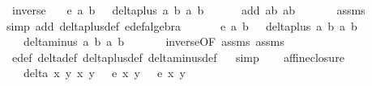 \begin{isabellebody}
\ inverse{\isacharcolon}\isanewline
\ \ \ {\isachardoublequoteopen}e\ a\ b\ {\isacharequal}\ {}{\isachardoublequoteclose}\ {\isachardoublequoteopen}delta{\isacharunderscore}plus\ a\ b\ a\ b\ {\isasymnoteq}\ {}{\isachardoublequoteclose}\ \isanewline
\ \ \ {\isachardoublequoteopen}add\ {\isacharparenleft}a{\isacharcomma}b{\isacharparenright}\ {\isacharparenleft}a{\isacharcomma}{\isacharminus}b{\isacharparenright}\ {\isacharequal}\ {\isacharparenleft}{}{\isacharcomma}{}{\isacharparenright}{\isachardoublequoteclose}\ \isanewline
%
\isadelimproof
\ \ %
\endisadelimproof
%
\isatagproof
{}\isamarkupfalse%
\ assms\ \isamarkupfalse%
{\isacharparenleft}simp\ add{\isacharcolon}\ delta{\isacharunderscore}plus{\isacharunderscore}def\ e{\isacharunderscore}def{\isacharcomma}algebra{\isacharparenright}%
\endisatagproof
{\isafoldproof}%
%
\isadelimproof
\ \isanewline
%
\endisadelimproof
\isanewline
{}\isamarkupfalse%
\ \isanewline
\ \ \ {\isachardoublequoteopen}e\ a\ b\ {\isacharequal}\ {}{\isachardoublequoteclose}\ {\isachardoublequoteopen}delta{\isacharunderscore}plus\ a\ b\ a\ b\ {\isasymnoteq}\ {}{\isachardoublequoteclose}\ \isanewline
\ \ \ {\isachardoublequoteopen}delta{\isacharunderscore}minus\ a\ b\ a\ {\isacharparenleft}{\isacharminus}b{\isacharparenright}\ {\isasymnoteq}\ {}{\isachardoublequoteclose}\ \isanewline
%
\isadelimproof
\ \ %
\endisadelimproof
%
\isatagproof
{}\isamarkupfalse%
\ inverse{\isacharbrackleft}OF\ assms{\isacharbrackright}\ assms{\isacharparenleft}{}{\isacharparenright}\ \isamarkupfalse%
\ e{\isacharunderscore}def\ delta{\isacharunderscore}def\ delta{\isacharunderscore}plus{\isacharunderscore}def\ delta{\isacharunderscore}minus{\isacharunderscore}def\isanewline
\ \ \isamarkupfalse%
{\isacharparenleft}simp{\isacharparenright}%
\endisatagproof
{\isafoldproof}%
%
\isadelimproof
\isanewline
%
\endisadelimproof
\ \ \isanewline
\isanewline
{}\isamarkupfalse%
\ affine{\isacharunderscore}closure{\isacharcolon}\isanewline
\ \ \ {\isachardoublequoteopen}delta\ x{}\ y{}\ x{}\ y{}\ {\isacharequal}\ {}{\isachardoublequoteclose}\ {\isachardoublequoteopen}e\ x{}\ y{}\ {\isacharequal}\ {}{\isachardoublequoteclose}\ {\isachardoublequoteopen}e\ x{}\ y{}\ {\isacharequal}\ {}{\isachardoublequoteclose}\isanewline

\end{isabellebody}
